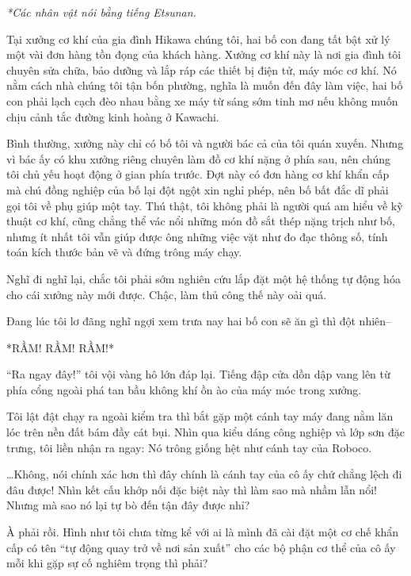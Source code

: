 \documentclass[../main.tex]{subfiles}
\begin{document}
\begin{center}
  {\textit{*Các nhân vật nói bằng tiếng Etsunan.}}
\end{center}


Tại xưởng cơ khí của gia đình Hikawa chúng tôi, hai bố con đang tất bật xử lý một vài đơn hàng tồn đọng của khách hàng. Xưởng cơ khí này là nơi gia đình tôi chuyên sửa chữa, bảo dưỡng và lắp ráp các thiết bị điện tử, máy móc cơ khí. Nó nằm cách nhà chúng tôi tận bốn phường, nghĩa là muốn đến đây làm việc, hai bố con phải lạch cạch đèo nhau bằng xe máy từ sáng sớm tinh mơ nếu không muốn chịu cảnh tắc đường kinh hoàng ở Kawachi.

Bình thường, xưởng này chỉ có bố tôi và người bác cả của tôi quán xuyến. Nhưng vì bác ấy có khu xưởng riêng chuyên làm đồ cơ khí nặng ở phía sau, nên chúng tôi chủ yếu hoạt động ở gian phía trước. Đợt này có đơn hàng cơ khí khẩn cấp mà chú đồng nghiệp của bố lại đột ngột xin nghỉ phép, nên bố bất đắc dĩ phải gọi tôi về phụ giúp một tay. Thú thật, tôi không phải là người quá am hiểu về kỹ thuật cơ khí, cũng chẳng thể vác nổi những món đồ sắt thép nặng trịch như bố, nhưng ít nhất tôi vẫn giúp được ông những việc vặt như đo đạc thông số, tính toán kích thước bản vẽ và đứng trông máy chạy.

Nghĩ đi nghĩ lại, chắc tôi phải sớm nghiên cứu lắp đặt một hệ thống tự động hóa cho cái xưởng này mới được. Chậc, làm thủ công thế này oải quá.

Đang lúc tôi lơ đãng nghĩ ngợi xem trưa nay hai bố con sẽ ăn gì thì đột nhiên--

*RẦM! RẦM! RẦM!*

``Ra ngay đây!'' tôi vội vàng hô lớn đáp lại. Tiếng đập cửa dồn dập vang lên từ phía cổng ngoài phá tan bầu không khí ồn ào của máy móc trong xưởng.

Tôi lật đật chạy ra ngoài kiểm tra thì bắt gặp một cánh tay máy đang nằm lăn lóc trên nền đất bám đầy cát bụi. Nhìn qua kiểu dáng công nghiệp và lớp sơn đặc trưng, tôi liền nhận ra ngay: Nó trông giống hệt như cánh tay của Roboco.

\dots Không, nói chính xác hơn thì đây chính là cánh tay của cô ấy chứ chẳng lệch đi đâu được! Nhìn kết cấu khớp nối đặc biệt này thì làm sao mà nhầm lẫn nổi! Nhưng mà sao nó lại tự bò đến tận đây được nhỉ?

À phải rồi. Hình như tôi chưa từng kể với ai là mình đã cài đặt một cơ chế khẩn cấp có tên ``tự động quay trở về nơi sản xuất'' cho các bộ phận cơ thể của cô ấy mỗi khi gặp sự cố nghiêm trọng thì phải?
\end{document}
